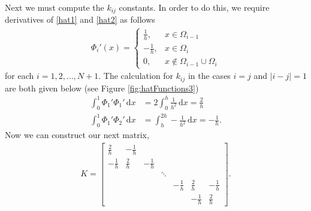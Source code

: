 \documentclass[undefended]{sfuthesis}
\begin{document}
Next we must compute the $k_{ij}$ constants. In order to do this, we require derivatives of \eqref{hat1} and \eqref{hat2} as follows
\begin{align*}
	\Phi_i'(x) = 
	\begin{cases} 
	\frac{1}{h}, & x \in \Omega_{i - 1} \\
	- \frac{1}{h}, & x \in \Omega_i \\
	0, & x\notin \Omega_{i - 1} \cup \Omega_i
	\end{cases} 
\end{align*}
for each $i = 1, 2, \dots, N + 1.$ The calculation for $k_{ij}$ in the cases $i = j$ and $|i - j| = 1$ are both given below (see Figure \ref{fig:hatFunctions3})
\begin{align*}
	\int_{0}^{1} \Phi_1' \Phi_1' \,\mathrm{d} x &= 2 \int_{0}^{h} \frac{1}{h^2} \,\mathrm{d} x = \frac{2}{h} \\
	\int_{0}^{1} \Phi_1' \Phi_2' \,\mathrm{d} x &= \int_{h}^{2h} -\frac{1}{h^2} \,\mathrm{d} x = -\frac{1}{h}.
\end{align*}
Now we can construct our next matrix,
\begin{align}
\label{K}
K = 
\begin{bmatrix}
\frac{2}{h} & -\frac{1}{h} &&&&& \\
-\frac{1}{h} & \frac{2}{h} & -\frac{1}{h} &&&& \\
&&& \ddots &&& \\
&&&& -\frac{1}{h} & \frac{2}{h} & -\frac{1}{h} \\
&&&&& -\frac{1}{h} & \frac{2}{h}
\end{bmatrix}.
\end{align}
\end{document}
